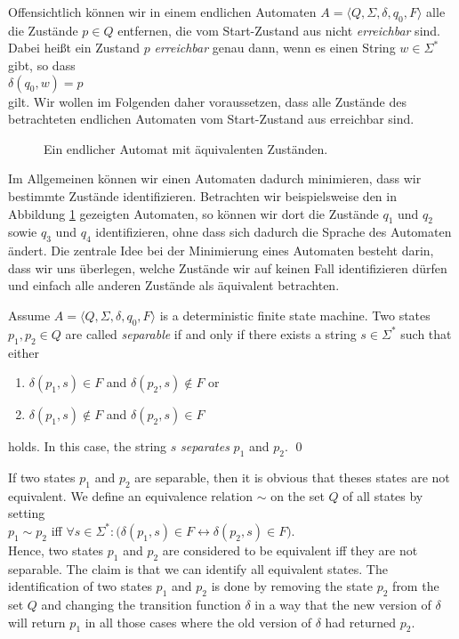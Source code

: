 Offensichtlich k\"onnen wir in einem endlichen Automaten 
$A = \langle Q, \Sigma, \delta, q_0, F \rangle$  alle die Zust\"ande $p \in Q$ entfernen,
die vom Start-Zustand aus nicht 
\emph{erreichbar} sind.  Dabei hei{\ss}t ein Zustand $p$ \emph{erreichbar} genau dann, wenn es
einen String $w \in \Sigma^*$ gibt, so dass
\\[0.2cm]
\hspace*{1.3cm}
$\delta(q_0, w) = p$
\\[0.2cm]
gilt.  Wir wollen im Folgenden daher voraussetzen, dass alle Zust\"ande des betrachteten
endlichen Automaten vom Start-Zustand aus erreichbar sind.


\begin{figure}[!ht]
  \centering
   \caption{Ein endlicher Automat mit \"aquivalenten Zust\"anden.}
  \label{fig:nicht-gleichwertig.dot}
\end{figure}

Im Allgemeinen k\"onnen wir einen Automaten dadurch minimieren, dass wir bestimmte Zust\"ande
identifizieren.  Betrachten wir beispielsweise den in Abbildung
\ref{fig:nicht-gleichwertig.dot} gezeigten Automaten, so k\"onnen wir dort die Zust\"ande $q_1$
und $q_2$ sowie $q_3$ und $q_4$ identifizieren, ohne dass sich dadurch die Sprache des
Automaten \"andert.  
Die zentrale Idee bei der Minimierung eines Automaten besteht darin, dass wir uns
\"uberlegen, welche Zust\"ande wir auf keinen Fall identifizieren d\"urfen und einfach alle
anderen Zust\"ande als \"aquivalent betrachten.

\begin{Definition}
Assume $A = \langle Q, \Sigma, \delta, q_0, F \rangle$ is a deterministic finite state machine.
Two states $p_1,p_2 \in Q$ are called \emph{separable} if and only if there exists a string 
$s \in \Sigma^*$ such that either
\begin{enumerate}
\item $\delta(p_1,s) \in    F$ and $\delta(p_2,s) \notin F$ or
\item $\delta(p_1,s) \notin F$ and $\delta(p_2,s) \in    F$
\end{enumerate}
holds.  In this case, the string $s$ \emph{separates} $p_1$ and $p_2$. \qed
\end{Definition}
If two states $p_1$ and $p_2$ are separable, then it is obvious that theses states are not
equivalent.
We define an equivalence relation $\sim$ on the set $Q$ of all states by setting
\\[0.2cm]
\hspace*{1.3cm}
$p_1 \sim p_2$ \quad iff \quad 
$\forall s \in \Sigma^*:\bigl(\delta(p_1,s) \in F \leftrightarrow \delta(p_2,s) \in F\bigr)$.
\\[0.2cm]
Hence, two states $p_1$ and $p_2$ are considered to be equivalent iff they are not separable.   
The claim is that we can identify all equivalent states.  The identification of two states $p_1$ and
$p_2$ is done by removing the state $p_2$ from the set $Q$ and changing the transition
function $\delta$ in a way that the new version of $\delta$ will return
$p_1$ in all those cases where the old version of $\delta$ had returned $p_2$.



